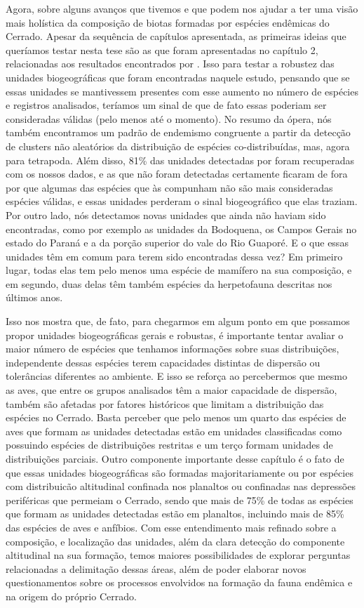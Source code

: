 \documentclass[12pt,openright,oneside,a4paper,english]{abntex2}
\begin{document}
Agora, sobre alguns avanços que tivemos e que podem nos ajudar a ter uma visão mais holística da composição de biotas formadas por espécies endêmicas do Cerrado. Apesar da sequência de capítulos apresentada, as primeiras ideias que queríamos testar nesta tese são as que foram apresentadas no capítulo 2, relacionadas aos resultados encontrados por \citet{Azevedo}. Isso para testar a robustez das unidades biogeográficas que foram encontradas naquele estudo, pensando que se essas unidades se mantivessem presentes com esse aumento no número de espécies e registros analisados, teríamos um sinal de que de fato essas poderiam ser consideradas válidas (pelo menos até o momento). No resumo da ópera, nós também encontramos um padrão de endemismo congruente a partir da detecção de clusters não aleatórios da distribuição de espécies co-distribuídas, mas, agora para tetrapoda. Além disso, 81\% das unidades detectadas por \citep{Azevedo2016} foram recuperadas com os nossos dados, e as que não foram detectadas certamente ficaram de fora por que algumas das espécies que às compunham não são mais consideradas espécies válidas, e essas unidades perderam o sinal biogeográfico que elas traziam. Por outro lado, nós detectamos novas unidades que ainda não haviam sido encontradas, como por exemplo as unidades da Bodoquena, os Campos Gerais no estado do Paraná e a da porção superior do vale do Rio Guaporé. E o que essas unidades têm em comum para terem sido encontradas dessa vez? Em primeiro lugar, todas elas tem pelo menos uma espécie de mamífero na sua composição, e em segundo, duas delas têm também espécies da herpetofauna descritas nos últimos anos. 

Isso nos mostra que, de fato, para chegarmos em algum ponto em que possamos propor unidades biogeográficas gerais e robustas, é importante tentar avaliar o maior número de espécies que tenhamos informações sobre suas distribuições, independente dessas espécies terem capacidades distintas de dispersão ou tolerâncias diferentes ao ambiente. E isso se reforça ao percebermos que mesmo as aves, que entre os grupos analisados têm a maior capacidade de dispersão, também são afetadas por fatores históricos que limitam a distribuição das espécies no Cerrado. Basta perceber que pelo menos um quarto das espécies de aves que formam as unidades detectadas estão em unidades classificadas como possuindo espécies de distribuições restritas e um terço formam unidades de distribuições parciais. Outro componente importante desse capítulo é o fato de que essas unidades biogeográficas são formadas majoritariamente ou por espécies com distribuicão altitudinal confinada nos planaltos ou confinadas nas depressões periféricas que permeiam o Cerrado, sendo que mais de 75\% de todas as espécies que formam as unidades detectadas estão em planaltos, incluindo mais de 85\% das espécies de aves e anfíbios. Com esse entendimento mais refinado sobre a composição, e localização das unidades, além da clara detecção do componente altitudinal na sua formação, temos maiores possibilidades de explorar perguntas relacionadas a delimitação dessas áreas, além de poder elaborar novos questionamentos sobre os processos envolvidos na formação da fauna endêmica e na origem do próprio Cerrado.
\end{document}
